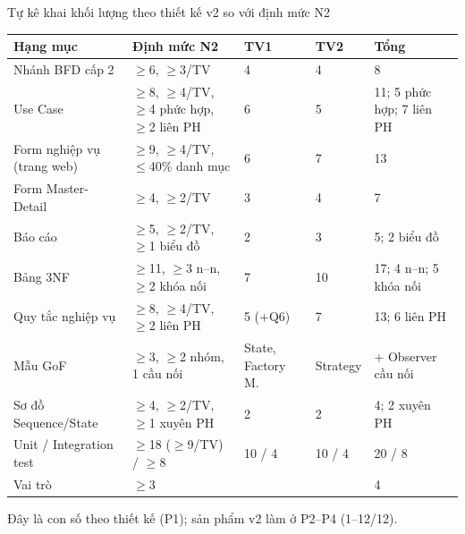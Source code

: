 
\begin{frame}{Tự kê khai khối lượng theo thiết kế v2 so với định mức N2 \TC}
\scriptsize
\begin{tabularx}{\textwidth}{@{}YL{3.6cm}L{1.6cm}L{1.6cm}L{3.0cm}@{}}
\toprule
\textbf{Hạng mục} & \textbf{Định mức N2} & \textbf{TV1} & \textbf{TV2} & \textbf{Tổng} \\
\midrule
Nhánh BFD cấp 2 & $\geq$6, $\geq$3/TV & 4 & 4 & 8 \\
Use Case & $\geq$8, $\geq$4/TV, $\geq$4 phức hợp, $\geq$2 liên PH & 6 & 5 & 11; 5 phức hợp; 7 liên PH \\
Form nghiệp vụ (trang web) & $\geq$9, $\geq$4/TV, $\leq$40\% danh mục & 6 & 7 & 13 \\
Form Master-Detail & $\geq$4, $\geq$2/TV & 3 & 4 & 7 \\
Báo cáo & $\geq$5, $\geq$2/TV, $\geq$1 biểu đồ & 2 & 3 & 5; 2 biểu đồ \\
Bảng 3NF & $\geq$11, $\geq$3 n--n, $\geq$2 khóa nối & 7 & 10 & 17; 4 n--n; 5 khóa nối \\
Quy tắc nghiệp vụ & $\geq$8, $\geq$4/TV, $\geq$2 liên PH & 5 (+Q6) & 7 & 13; 6 liên PH \\
Mẫu GoF & $\geq$3, $\geq$2 nhóm, 1 cầu nối & State, Factory M. & Strategy & + Observer cầu nối \\
Sơ đồ Sequence/State & $\geq$4, $\geq$2/TV, $\geq$1 xuyên PH & 2 & 2 & 4; 2 xuyên PH \\
Unit / Integration test & $\geq$18 ($\geq$9/TV) / $\geq$8 & 10 / 4 & 10 / 4 & 20 / 8 \\
Vai trò & $\geq$3 & & & 4 \\
\bottomrule
\end{tabularx}
{\tiny Đây là con số theo thiết kế (P1); sản phẩm v2 làm ở P2--P4 (1--12/12).\par}
\end{frame}

